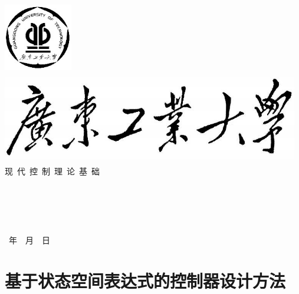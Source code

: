 \documentclass[UTF8]{ctexart}
\begin{document}
	\begin{titlepage}
               	\includegraphics[width=3.0cm,height=3.0cm]{gdut1.jpg}\\

		\centering
		\quad\includegraphics[width=13cm,height=4cm]{gdut.jpg}\\
		\vspace*{0.5cm}
		{\fontsize{30pt}\baselineskip 现\quad\ 代\quad\ 控\quad\ 制\quad\ 理\quad\ 论\quad\ 基\quad\ 础}\\

		 \vskip 2.0cm
		 \fontsize{19pt}\baselineskip
		 \underline{}\\%
		 \vskip 0.9cm
		 \underline{}\\
		 \vskip 0.9cm
		 \underline{}\\
		 \vskip 0.9cm
		 \underline{}\\
		 \vskip 0.9cm
		 \underline{}\\
		 \vskip 2cm
		 \LARGE \textbf{\number \year }~年~\textbf{\number\month}~月~\textbf{\number\day}~日		 
	\end{titlepage}



\tableofcontents\thispagestyle{empty}
\newpage
\setcounter{page}{1}
\section{基于状态空间表达式的控制器设计方法 }
\end{document}
